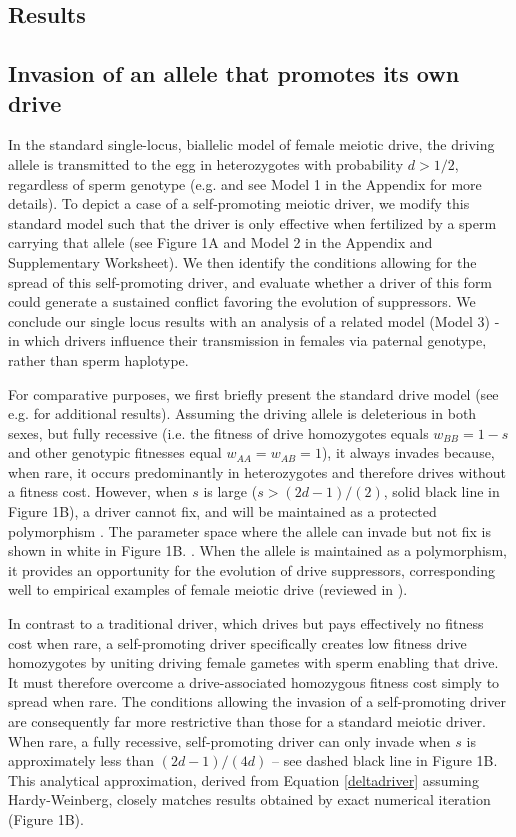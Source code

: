 \documentclass{pnastwo}
\begin{document}
\begin{article}
\section{Results}
\subsection{Invasion of an allele that promotes its own drive}
In the standard single-locus, biallelic model of female meiotic drive,
the driving allele is transmitted to the egg in heterozygotes with
probability  $d > 1/2$, regardless of sperm genotype (e.g. \cite{Ubeda2004} and see Model 1 in the Appendix for more details). 
To depict a case of a self-promoting meiotic driver,  we modify this standard model such 
	that the driver is only effective when fertilized by a sperm carrying that allele (see Figure 1A and Model 2 	in the Appendix and Supplementary Worksheet). 
We then identify the conditions allowing for the spread of this self-promoting driver, 
	and evaluate whether a driver of this form could generate a sustained conflict favoring the evolution of suppressors. 
We conclude our single locus results with an analysis of a related model (Model 3) - in which
drivers influence their transmission in females via paternal genotype,
rather than sperm haplotype. 

For comparative purposes, we first briefly present the standard drive model 
	(see e.g. \cite{Prout1973,Ubeda2004} for additional results). 
Assuming the driving allele is deleterious in both sexes, but fully recessive 
	(i.e. the fitness of drive homozygotes equals $w_{BB}=1-s$ and other genotypic fitnesses equal $w_{AA}=w_{AB}=1$), 
	it always invades because, when rare, it occurs predominantly in heterozygotes and therefore drives without a fitness cost. 
However, when $s$ is large ($s>(2d-1)/(2)$, solid black line in Figure 1B), a driver cannot fix, and
will be maintained as a protected polymorphism \cite{Prout1973}. 
The parameter space where the allele can invade but not fix is shown in white
        in Figure 1B. . 
When the allele is maintained as a polymorphism, it provides an opportunity for the evolution of
	drive suppressors, corresponding well to empirical examples of
        female meiotic drive (reviewed in \cite{Burt2006}). 

In contrast to a traditional driver, which drives but pays effectively
	no fitness cost when rare, 
a self-promoting driver specifically creates low fitness drive homozygotes 
	by uniting driving female gametes with sperm enabling that drive.
It must therefore overcome a drive-associated homozygous fitness cost simply to spread when rare. 
The conditions allowing the invasion of a self-promoting driver
 	are consequently far more restrictive than those for a standard meiotic driver.
When rare, a fully recessive, self-promoting driver can only invade when $s$ 
	is approximately less than $(2 d - 1)/(4 d)$ -- see dashed black line in Figure 1B. 
This analytical approximation, derived from Equation \eqref{deltadriver} assuming Hardy-Weinberg, 
	closely matches results obtained by exact numerical iteration (Figure 1B). 




\end{article}
\end{document}
